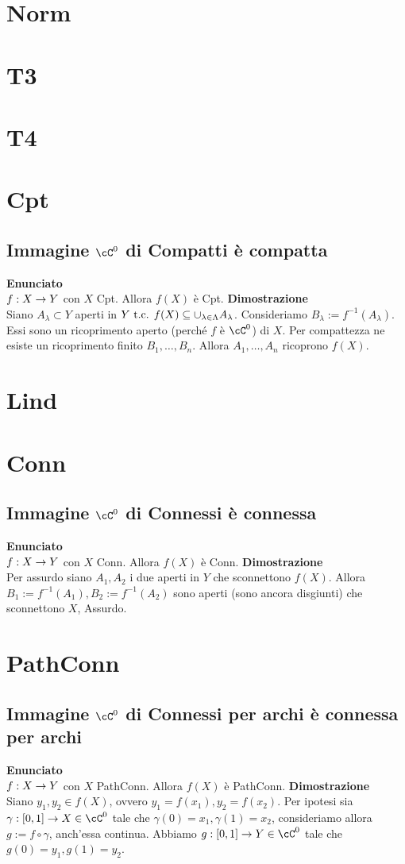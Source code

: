 \documentclass[a4paper,11pt,NoNotes,GeneralMath]{stdmdoc}
\newcommand{\Enunciato}{\vskip 0.05cm \noindent \textbf{Enunciato} \\ }
\renewcommand{\Dimostrazione}{\vskip 0.05cm \noindent \textbf{Dimostrazione} \\ }
\begin{document}
	\section*{Norm}
	\section*{T3}
	\section*{T4}
	
	\section*{Cpt}
	\subsection*{Immagine $\cC^0$ di Compatti è compatta}
	\Enunciato $f: X \rightarrow Y$ con $X$ Cpt. Allora $f(X)$ è Cpt.
	\Dimostrazione Siano $A_\lambda \subset Y$ aperti in $Y \mbox{ t.c. } f(X) \subseteq \cup_{\lambda \in \Lambda} A_\lambda$. Consideriamo $B_\lambda := f^{-1}(A_\lambda)$. Essi sono un ricoprimento aperto (perché $f$ è $\cC^0$) di $X$. Per compattezza ne esiste un ricoprimento finito $B_1, \ldots, B_n$. Allora $A_1, \ldots, A_n$ ricoprono $f(X)$.

	\section*{Lind}
	\section*{Conn}
	\subsection*{Immagine $\cC^0$ di Connessi è connessa}
	\Enunciato $f: X \rightarrow Y$ con $X$ Conn. Allora $f(X)$ è Conn.
	\Dimostrazione Per assurdo siano $A_1, A_2$ i due aperti in $Y$ che sconnettono $f(X)$. Allora $B_1 := f^{-1}(A_1), B_2 := f^{-1}(A_2)$ sono aperti (sono ancora disgiunti) che sconnettono $X$, Assurdo.

	\section*{PathConn}
	\subsection*{Immagine $\cC^0$ di Connessi per archi è connessa per archi}
	\Enunciato $f: X \rightarrow Y$ con $X$ PathConn. Allora $f(X)$ è PathConn.
	\Dimostrazione Siano $y_1, y_2 \in f(X)$, ovvero $y_1 = f(x_1), y_2 = f(x_2)$. Per ipotesi sia $\gamma: [0,1] \rar X \in \cC^0$ tale che $\gamma(0) = x_1, \gamma(1) = x_2$, consideriamo allora $g := f \circ \gamma$, anch'essa continua. Abbiamo $g: [0,1] \rar Y \in \cC^0$ tale che $g(0) = y_1, g(1) = y_2$.
\end{document}
